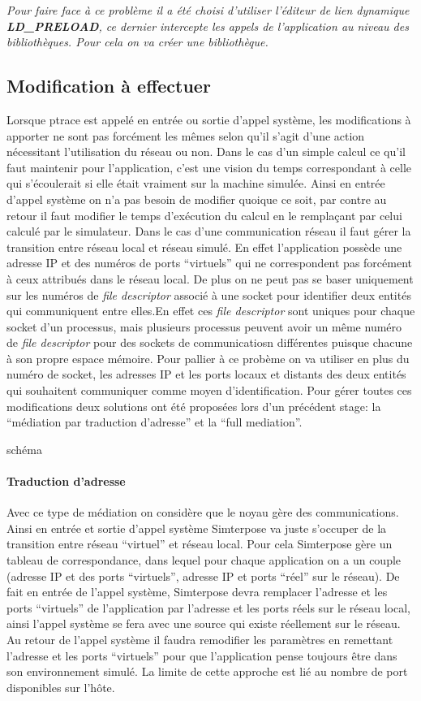 \textit{Pour faire face à ce problème il a été choisi d'utiliser l'éditeur de
  lien dynamique \textbf{LD\_PRELOAD}, ce dernier intercepte les appels de
  l'application au niveau des bibliothèques. Pour cela on va créer une
  bibliothèque.}

\subsection{Modification à effectuer}
Lorsque ptrace est appelé en entrée ou sortie d'appel système, les modifications
à apporter ne sont pas forcément les mêmes selon qu'il s'agit d'une action
nécessitant l'utilisation du réseau ou non. Dans le cas d'un simple calcul ce
qu'il faut maintenir pour l'application, c'est une vision du temps correspondant
à celle qui s'écoulerait si elle était vraiment sur la machine simulée. Ainsi en
entrée d'appel système on n'a pas besoin de modifier quoique ce soit, par contre
au retour il faut modifier le temps d'exécution du calcul en le remplaçant par
celui calculé par le simulateur. Dans le cas d'une communication réseau il faut
gérer la transition entre réseau local et réseau simulé. En effet l'application
possède une adresse IP et des numéros de ports ``virtuels'' qui ne correspondent
pas forcément à ceux attribués dans le réseau local. De plus on ne peut pas se
baser uniquement sur les numéros de \textit{file descriptor} associé à une
socket pour identifier deux entités qui communiquent entre elles.En effet ces
\textit{file descriptor} sont uniques pour chaque socket d'un processus, mais
plusieurs processus peuvent avoir un même numéro de \textit{file descriptor}
pour des sockets de communicatiosn différentes puisque chacune à son propre
espace mémoire. Pour pallier à ce probème on va utiliser en plus du numéro de
socket, les adresses IP et les ports locaux et distants des deux entités qui
souhaitent communiquer comme moyen d'identification. Pour gérer toutes ces
modifications deux solutions ont été proposées lors d'un précédent stage: la
``médiation par traduction d'adresse'' et la ``full mediation''.

{\color{red}schéma}
\paragraph{Traduction d'adresse}
 Avec ce type de médiation on considère que le noyau gère des
 communications. Ainsi en entrée et sortie d'appel système Simterpose va juste
 s'occuper de la transition entre réseau ``virtuel'' et réseau local. Pour cela
 Simterpose gère un tableau de correspondance, dans lequel pour chaque
 application on a un couple (adresse IP et des ports ``virtuels'', adresse IP et
 ports ``réel'' sur le réseau).  De fait en entrée de l'appel système,
 Simterpose devra remplacer l'adresse et les ports ``virtuels'' de l'application
 par l'adresse et les ports réels sur le réseau local, ainsi l'appel système se
 fera avec une source qui existe réellement sur le réseau. Au retour de l'appel
 système il faudra remodifier les paramètres en remettant l'adresse et les ports
 ``virtuels'' pour que l'application pense toujours être dans son environnement
 simulé.  La limite de cette approche est lié au nombre de port disponibles sur
 l'hôte. 


